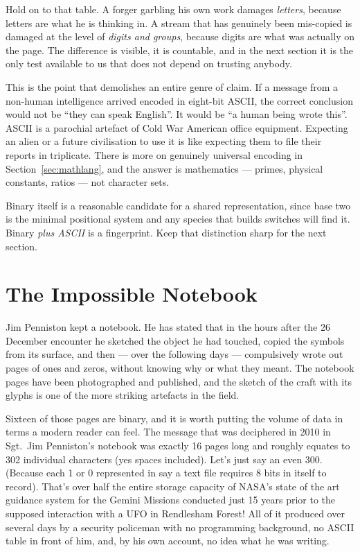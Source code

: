 Hold on to that table. A forger garbling his own work damages \emph{letters}, because letters
are what he is thinking in. A stream that has genuinely been mis-copied is damaged at the level
of \emph{digits and groups}, because digits are what was actually on the page. The difference is
visible, it is countable, and in the next section it is the only test available to us that does
not depend on trusting anybody.

\begin{funfact}
This is the point that demolishes an entire genre of claim. If a message from a
non-human intelligence arrived encoded in eight-bit ASCII, the correct conclusion would not
be ``they can speak English''. It would be ``a human being wrote this''. ASCII is a
parochial artefact of Cold War American office equipment. Expecting an alien or a future
civilisation to use it is like expecting them to file their reports in triplicate. There is
more on genuinely universal encoding in Section~\ref{sec:mathlang}, and the answer is
mathematics --- primes, physical constants, ratios --- not character sets.
\end{funfact}

Binary itself is a reasonable candidate for a shared representation, since base two is the
minimal positional system and any species that builds switches will find it. Binary
\emph{plus ASCII} is a fingerprint. Keep that distinction sharp for the next section.

\section{The Impossible Notebook}\label{sec:impossiblenotebook}

Jim Penniston kept a notebook. He has stated that in the hours after the 26 December
encounter he sketched the object he had touched, copied the symbols from its surface, and
then --- over the following days --- compulsively wrote out pages of ones and zeros, without
knowing why or what they meant. The notebook pages have been photographed and published,
and the sketch of the craft with its glyphs is one of the more striking artefacts in the
field.

Sixteen of those pages are binary, and it is worth putting the volume of data in terms a
modern reader can feel. The message that was deciphered in 2010 in Sgt.\ Jim Penniston's
notebook was exactly 16 pages long and roughly equates to 302 individual characters (yes
spaces included). Let's just say an even 300.  (Because each 1 or 0 represented in say a text file
requires 8 bits in itself to record). That's over half the entire storage capacity of NASA's
state of the art guidance system for the Gemini Missions conducted just 15 years prior to the
supposed interaction with a UFO in Rendlesham Forest! All of it produced over several days by
a security policeman with no programming background, no ASCII table in front of him, and, by
his own account, no idea what he was writing.

